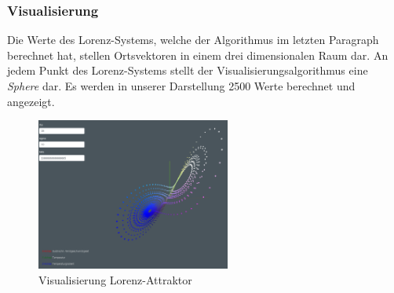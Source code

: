 \subsubsection{Visualisierung}
Die Werte des Lorenz-Systems, welche der Algorithmus im letzten Paragraph berechnet hat, stellen Ortsvektoren in einem drei dimensionalen Raum dar. An jedem Punkt des Lorenz-Systems stellt der Visualisierungsalgorithmus eine \textit{Sphere} dar. Es werden in unserer Darstellung 2500 Werte berechnet und angezeigt.

\begin{figure}
	\centering	\includegraphics[height=5cm]{lorenz/assets/implementation/Visualisierung}
	\caption{Visualisierung Lorenz-Attraktor}
	\label{fig:visualisierung}
\end{figure}
